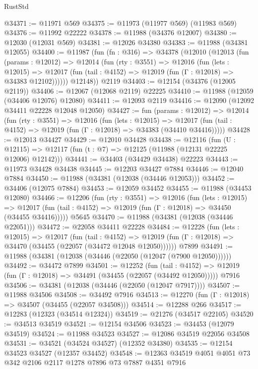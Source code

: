 \begin{lexlean}{RustStd}
\begin{coremodule}
@34371 := @11971 @569
@34375 := @11973 (@11977 @569) (@11983 @569)
@34376 := @11992 @22222
@34378 := @11988 (@34376 @12007)
@34380 := @12030 (@12031 @569)
@34381 := @12026 @34380
@34383 := @11988 (@34381 @12055)
@34400 := @11987
    (fun (fn : @316) =>
    @34378
      (@12010
        (@12013
          (fun (params : @12012) =>
          @12014
            (fun (rty : @3551) =>
            @12016
              (fun (lets : @12015) =>
              @12017 (fun (tail : @4152) => @12019 (fun (Γ : @12018) => @34383 @12102))))))
        @12148))
    @2119
@34403 := @12154 (@34376 (@12005 @2119))
@34406 := @12067 (@12068 @2119) @22225
@34410 := @11988 (@12059 (@34406 @12076) @12080)
@34411 := @12093 @2119
@34416 := @12090 (@12092 @34411 @22228 @12048 @12050)
@34427 := fun (params : @12012) =>
  @12014
    (fun (rty : @3551) =>
    @12016
      (fun (lets : @12015) =>
      @12017 (fun (tail : @4152) => @12019 (fun (Γ : @12018) => @34383 (@34410 @34416)))))
@34428 := @12013 @34427
@34429 := @12010 @34428
@34438 := @12116
    (fun (U : @12115) => @12117 (fun (t : @7) => @12125 (@11988 (@12131 @22225 @12006) @12142)))
@34441 := @34403 (@34429 @34438) @22223
@34443 := @11973 @34428 @34438
@34445 := @12203 @34427 @7884
@34446 := @12040 @7884
@34450 := @11988 (@34381 (@12038 (@34446 @12053)))
@34452 := @34406 (@12075 @7884)
@34453 := @12059 @34452
@34455 := @11988 (@34453 @12080)
@34466 := @12206
    (fun (rty : @3551) =>
    @12016
      (fun (lets : @12015) =>
      @12017 (fun (tail : @4152) => @12019 (fun (Γ : @12018) => @34450 (@34455 @34416)))))
    @5645
@34470 := @11988 (@34381 (@12038 (@34446 @22051)))
@34472 := @22058 @34411 @22228
@34484 := @12228
    (fun (lets : @12015) =>
    @12017
      (fun (tail : @4152) =>
      @12019 (fun (Γ : @12018) => @34470 (@34455 (@22057 (@34472 @12048 @12050))))))
    @7899
@34491 := @11988 (@34381 (@12038 (@34446 (@22050 (@12047 (@7900 @12050))))))
@34492 := @34472 @7899
@34501 := @12252
    (fun (tail : @4152) => @12019 (fun (Γ : @12018) => @34491 (@34455 (@22057 (@34492 @12050)))))
    @7916
@34506 := @34381 (@12038 (@34446 (@22050 (@12047 @7917))))
@34507 := @11988 @34506
@34508 := @34492 @7916
@34513 := @12270 (fun (Γ : @12018) => @34507 (@34455 (@22057 @34508)))
@34514 := @12288 @266
@34517 := @12283 (@12323 (@34514 @12324))
@34519 := @21276 (@34517 @22105)
@34520 := @34513 @34519
@34521 := @12154 @34506
@34523 := @34453 (@12079 @34519)
@34524 := @11988 @34523
@34527 := @12086 @34519 @22056 @34508
@34531 := @34521 (@34524 @34527) (@12352 @34380)
@34535 := @12154 @34523 @34527 (@12357 @34452)
@34548 := @12363 @34519 @4051 @4051 @73 @342 @2106 @2117 @1278 @7896 @73 @7887 @4351 @7916

\end{coremodule}
\end{lexlean}
